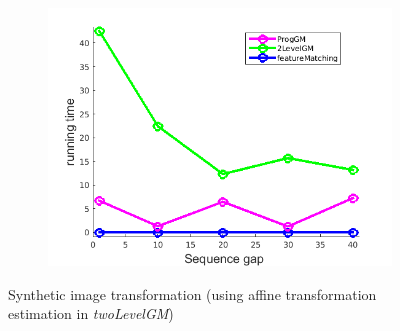 \documentclass[
	fontsize=12pt,
	paper=a4,
	twoside=false,
	numbers=noenddot,
	plainheadsepline,
	toc=listof,
	toc=bibliography
]{scrartcl}
\begin{document}
\begin{figure}[h]
\begin{subfigure}[b]{0.3\textwidth}
		\includegraphics[scale=0.25]{"fig_ver2608/RealImages/ImgTrafo/no_descr/using_ransac_afftrafo/performance/time"}  
	\end{subfigure} 	
	\caption{Synthetic image transformation (using affine transformation estimation in \emph{twoLevelGM})}
\end{figure}
\FloatBarrier
\end{document}
